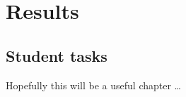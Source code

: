 \chapter{Results}
\label{chap:results}

\section{Student tasks}
\label{sec:studenttasks}

Hopefully this will be a useful chapter \ldots